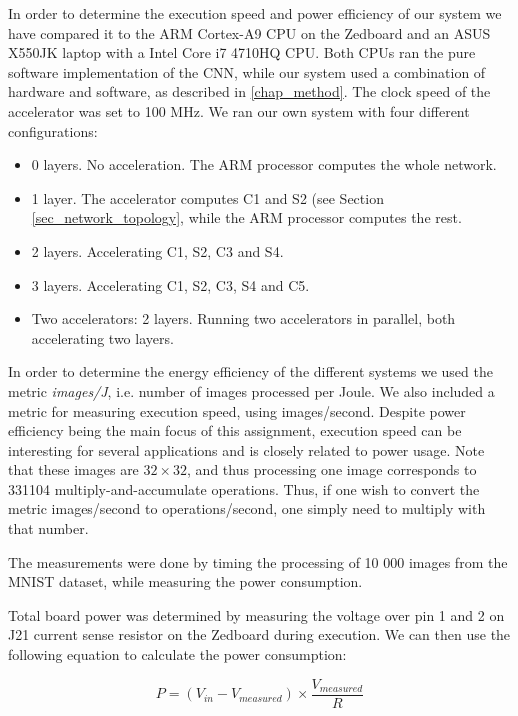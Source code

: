 In order to determine the execution speed and power efficiency of our system we have compared it to the ARM Cortex-A9 CPU on the Zedboard and an ASUS X550JK laptop with a Intel Core i7 4710HQ CPU. Both CPUs ran the pure software implementation of the CNN, while our system used a combination of hardware and software, as described in \ref{chap_method}. The clock speed of the accelerator was set to 100 MHz. We ran our own system with four different configurations:

\begin{itemize}
\item 0 layers. No acceleration. The ARM processor computes the whole network.
\item 1 layer. The accelerator computes C1 and S2 (see Section \ref{sec_network_topology}, while the ARM processor computes the rest. 
\item 2 layers. Accelerating C1, S2, C3 and S4.
\item 3 layers. Accelerating C1, S2, C3, S4 and C5.
\item Two accelerators: 2 layers. Running two accelerators in parallel, both accelerating two layers.
\end{itemize}

In order to determine the energy efficiency of the different systems we used the metric \textit{images/J}, i.e. number of images processed per Joule. We also included a metric for measuring execution speed, using images/second. Despite power efficiency being the main focus of this assignment, execution speed can be interesting for several applications and is closely related to power usage. Note that these images are $ 32 \times 32 $, and thus processing one image corresponds to 331104 multiply-and-accumulate operations. Thus, if one wish to convert the metric images/second to operations/second, one simply need to multiply with that number.

The measurements were done by timing the processing of 10 000 images from the MNIST dataset, while measuring the power consumption. 

Total board power was determined by measuring the voltage over pin 1 and 2 on J21 current sense resistor on the Zedboard during execution. We can then use the following equation to calculate the power consumption:

\begin{equation}\label{eq_power_measurement}
 P = (V_{in}-V_{measured}) \times \frac{V_{measured}}{R}
\end{equation}


